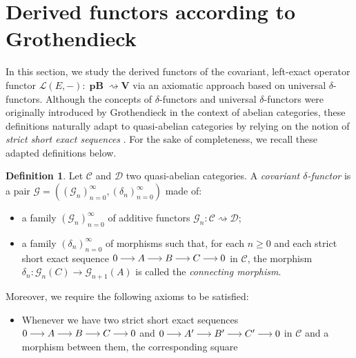 \documentclass[12pt,a4paper]{amsproc}
\theoremstyle{remark}
\theoremstyle{definition}
\newtheorem{defi}[thm]{Definition}
\newcommand{\pBan}{\operatorname{\textbf{pB}}}
\numberwithin{equation}{section}
\begin{document}
\section{Derived functors according to Grothendieck} \label{grothendieck}
In this section, we study the derived functors of the covariant, left-exact operator functor $\mathcal{L}(E,-): \boldsymbol{\pBan} \rightsquigarrow \mathbf{V}$ via an axiomatic approach based on universal $\delta$-functors. Although the concepts of $\delta$-functors and universal $\delta$-functors were originally introduced by Grothendieck \cite{tohoku} in the context of abelian categories, these definitions naturally adapt to quasi-abelian categories by relying on the notion of \emph{strict short exact sequences} \cite{quillen1973}. For the sake of completeness, we recall these adapted definitions below.
\begin{defi}
    Let $\mathcal{C}$ and $\mathcal{D}$ two quasi-abelian categories. A \emph{covariant $\delta$-functor} is a pair $\mathcal{G}=((\mathcal{G}_n)_{n=0}^{\infty}, (\delta_n)_{n=0}^{\infty})$ made of:
    \begin{itemize}
        \item a family $(\mathcal{G}_n)_{n=0}^{\infty}$ of additive functors $\mathcal{G}_n:\mathcal{C} \rightsquigarrow \mathcal{D}$;
        \item a family $(\delta_n)_{n=0}^{\infty}$ of morphisms such that, for each $n \geq 0$ and each strict short exact sequence $\begin{tikzcd}[cramped, column sep=1.5em]
		0 \arrow[r] & A \arrow[r] & B \arrow[r] & C \arrow[r] & 0 
	\end{tikzcd}$ in $\mathcal{C}$, the morphism $\delta_n: \mathcal{G}_n(C) \to \mathcal{G}_{n+1}(A)$ is called the \emph{connecting morphism}.
    \end{itemize}
    Moreover, we require the following axioms to be satisfied:
    \begin{itemize}
        \item Whenever we have two strict short exact sequences $\begin{tikzcd}[cramped, column sep=1.5em]
		0 \arrow[r] & A \arrow[r] & B \arrow[r] & C \arrow[r] & 0 
	\end{tikzcd} $ and $\begin{tikzcd}[cramped, column sep=1.5em]
		0 \arrow[r] & A' \arrow[r] & B' \arrow[r] & C' \arrow[r] & 0 
	\end{tikzcd} $ in $\mathcal{C}$ and a morphism between them, the corresponding square
    \begin{equation}

\end{equation}
\end{itemize}
\end{defi}
\end{document}
